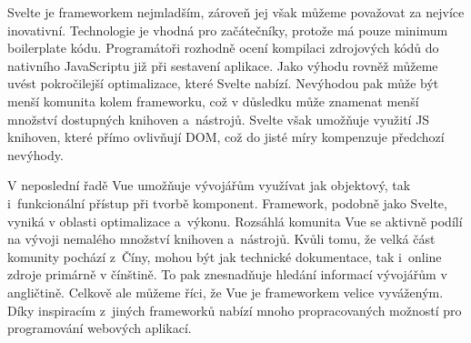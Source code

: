 Svelte je frameworkem nejmladším, zároveň jej však můžeme považovat za nejvíce inovativní. 
Technologie je vhodná pro začátečníky, protože má pouze minimum boilerplate kódu. 
Programátoři rozhodně ocení kompilaci zdrojových kódů do nativního JavaScriptu již při sestavení aplikace. 
Jako výhodu rovněž můžeme uvést pokročilejší optimalizace, které Svelte nabízí. 
Nevýhodou pak může být menší komunita kolem frameworku, což v důsledku může znamenat menší množství dostupných knihoven a~nástrojů. 
Svelte však umožňuje využití JS knihoven, které přímo ovlivňují DOM, což do jisté míry kompenzuje předchozí nevýhody.

V neposlední řadě Vue umožňuje vývojářům využívat jak objektový, tak i~funkcionální přístup při tvorbě komponent. 
Framework, podobně jako Svelte, vyniká v oblasti optimalizace a~výkonu. Rozsáhlá komunita Vue se aktivně podílí na vývoji nemalého množství knihoven a~nástrojů. 
Kvůli tomu, že velká část komunity pochází z~Číny, mohou být jak technické dokumentace, tak i~online zdroje primárně v čínštině. 
To pak znesnadňuje hledání informací vývojářům v angličtině. Celkově ale můžeme říci, že Vue je frameworkem velice vyváženým. 
Díky inspiracím z~jiných frameworků nabízí mnoho propracovaných možností pro programování webových aplikací.